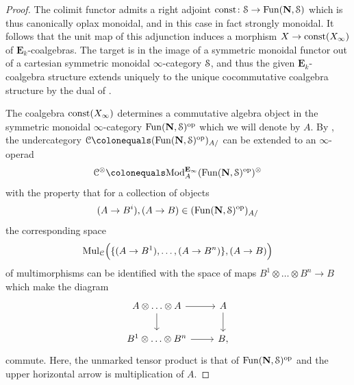 \documentclass[oneside,a4paper]{amsart}
\begin{document}
\begin{proof}
The colimit functor admits a right adjoint $\mathrm{const} \colon \EuScript{S} \rightarrow \mathrm{Fun}(\mathbf{N}, \EuScript{S})$ which is thus canonically oplax monoidal, and in this case in fact strongly monoidal. It follows that the unit map of this adjunction induces a morphism $X \rightarrow \mathrm{const}(X_{\infty})$ of $\mathbf{E}_{k}$-coalgebras. The target is in the image of a symmetric monoidal functor out of a cartesian symmetric monoidal $\infty$-category $\EuScript{S}$, and thus the given $\mathbf{E}_{k}$-coalgebra structure extends uniquely to the unique cocommutative coalgebra structure by the dual of \cite[{Proposition 2.4.3.9}]{HA}. 

The coalgebra $\mathrm{const}(X_{\infty})$ determines a commutative algebra object in the symmetric monoidal $\infty$-category $\mathrm{Fun}(\mathbf{N}, \EuScript{S})^{\mathrm{op}}$ which we will denote by $A$. By \cite[{Theorem 3.3.3.9}]{HA}, the undercategory $\ccat \colonequals (\Fun(\mathbf{N}, \spaces)^{\op})_{A /}$ can be extended to an $\infty$-operad 
\[
\ccat^{\otimes} \colonequals \Mod^{\mathbf{E}_{\infty}}_{A}(\Fun(\mathbf{N}, \spaces)^{\op})^{\otimes}
\]
with the property that for a collection of objects
\[
(A \rightarrow B^{i}), (A \rightarrow B) \in (\mathrm{Fun}(\mathbf{N}, \EuScript{S})^{\mathrm{op}})_{A /}
\]
the corresponding space 
\[
\mathrm{Mul}_{\EuScript{C}} \Big(\{ (A \rightarrow B^{1}), \ldots, (A \rightarrow B^{n}) \}, (A \rightarrow B)\Big) 
\]
of multimorphisms can be identified with the space of maps $B^{1} \otimes \ldots \otimes B^{n} \rightarrow B$ which make the diagram
\[
\begin{tikzcd}
	{A \otimes \ldots \otimes A} & A \\
	{B^{1} \otimes \ldots \otimes B^{n} } & B
	\arrow[from=1-1, to=1-2]
	\arrow[from=1-1, to=2-1]
	\arrow[from=1-2, to=2-2]
	\arrow[from=2-1, to=2-2],
\end{tikzcd}\]
commute. Here, the unmarked tensor product is that of $\mathrm{Fun}(\mathbf{N}, \EuScript{S})^{\mathrm{op}}$ and the upper horizontal arrow is multiplication of $A$. 


\end{proof}
\end{document}
